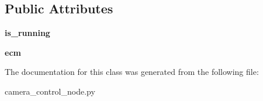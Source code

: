 \subsection*{Public Attributes}
\begin{DoxyCompactItemize}
\item 
\hypertarget{classcamera__control__node_1_1camera__qt__gui_1_1thread__home__arms_a389c4c7ae670151b39e08fa53fc934ab}{{\bfseries is\-\_\-running}}\label{classcamera__control__node_1_1camera__qt__gui_1_1thread__home__arms_a389c4c7ae670151b39e08fa53fc934ab}

\item 
\hypertarget{classcamera__control__node_1_1camera__qt__gui_1_1thread__home__arms_a1ff7c77b70e5ac413ca9b80502d3ea95}{{\bfseries ecm}}\label{classcamera__control__node_1_1camera__qt__gui_1_1thread__home__arms_a1ff7c77b70e5ac413ca9b80502d3ea95}

\end{DoxyCompactItemize}


The documentation for this class was generated from the following file\-:\begin{DoxyCompactItemize}
\item 
camera\-\_\-control\-\_\-node.\-py\end{DoxyCompactItemize}
